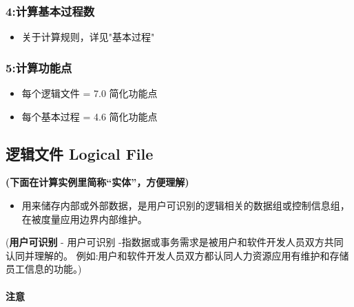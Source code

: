 \hypertarget{ux8ba1ux7b97ux57faux672cux8fc7ux7a0bux6570}{%
\subsubsection{4:计算基本过程数}\label{ux8ba1ux7b97ux57faux672cux8fc7ux7a0bux6570}}

\begin{itemize}
\tightlist
\item
  关于计算规则，详见"基本过程"
\end{itemize}

\hypertarget{ux8ba1ux7b97ux529fux80fdux70b9}{%
\subsubsection{5:计算功能点}\label{ux8ba1ux7b97ux529fux80fdux70b9}}

\begin{itemize}
\tightlist
\item
  每个逻辑文件 = 7.0 简化功能点
\item
  每个基本过程 = 4.6 简化功能点
\end{itemize}

\hypertarget{ux903bux8f91ux6587ux4ef6-logical-file}{%
\subsection{逻辑文件 Logical
File}\label{ux903bux8f91ux6587ux4ef6-logical-file}}

\textbf{(下面在计算实例里简称``实体''，方便理解)}

\begin{itemize}
\tightlist
\item
  用来储存内部或外部数据，是用户可识别的逻辑相关的数据组或控制信息组，在被度量应用边界内部维护。
\end{itemize}

\begin{description}
\tightlist
\item[]
(\textbf{用户可识别} -
用户可识别 -指数据或事务需求是被用户和软件开发人员双方共同认同并理解的。
例如:用户和软件开发人员双方都认同人力资源应用有维护和存储员工信息的功能。)
\end{description}

\hypertarget{ux6ce8ux610f}{%
\paragraph{注意}\label{ux6ce8ux610f}}

